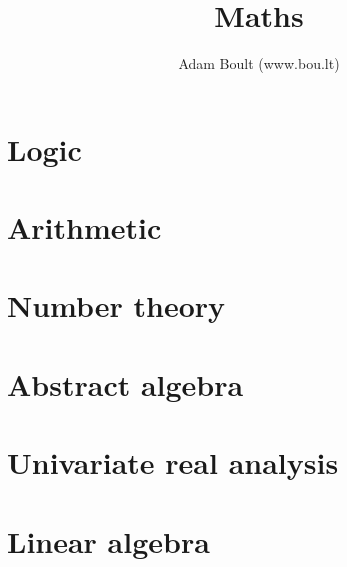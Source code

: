 \documentclass[oneside]{book}
\begin{document}
\author{Adam Boult (www.bou.lt)}
\title{Maths}
\maketitle

\setcounter{tocdepth}{1}
\tableofcontents



\part{Logic}




\part{Arithmetic}






\part{Number theory}













\part{Abstract algebra}




\part{Univariate real analysis}











\part{Linear algebra}








\end{document}
